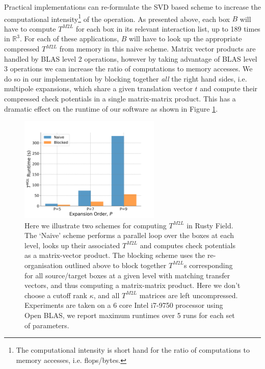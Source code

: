 Practical implementations can re-formulate the SVD based scheme to increase the computational intensity\footnote{The computational intensity is short hand for the ratio of computations to memory accesses, i.e. flops/bytes.} of the operation. As presented above, each box $B$ will have to compute $T^{M2L}$ for each box in its relevant interaction list, up to 189 times in $\mathbb{R}^3$. For each of these applications, $B$ will have to look up the appropriate compressed $T^{M2L}$ from memory in this naive scheme. Matrix vector products are handled by BLAS level 2 operations, however by taking advantage of BLAS level 3 operations we can increase the ratio of computations to memory accesses. We do so in our implementation by blocking together \textit{all} the right hand sides, i.e. multipole expansions, which share a given translation vector $t$ and compute their compressed check potentials in a single matrix-matrix product. This has a dramatic effect on the runtime of our software as shown in Figure \ref{fig:chpt:3:sec:1:subsec:1:svd_m2l}.

\begin{figure}
    \centering
    \includegraphics[width=0.6\textwidth]{images/ch_3/svd_m2l.png}
    \caption{Here we illustrate two schemes for computing $T^{M2L}$ in Rusty Field. The `Naive' scheme performs a parallel loop over the boxes at each level, looks up their associated $T^{M2L}$ and computes check potentials as a matrix-vector product. The blocking scheme uses the re-organisation outlined above to block together $T^{M2L}$s corresponding for all source/target boxes at a given level with matching transfer vectors, and thus computing a matrix-matrix product. Here we don't choose a cutoff rank $\kappa$, and all $T^{M2L}$ matrices are left uncompressed. Experiments are taken on a 6 core Intel i7-9750 processor using Open BLAS, we report maximum runtimes over 5 runs
    for each set of parameters.}
    \label{fig:chpt:3:sec:1:subsec:1:svd_m2l}
\end{figure}

